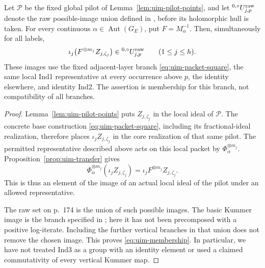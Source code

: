 \begin{theorem}
\label{thm:uim-base-membership}
Let \(\mathcal P\) be the fixed global
pilot of Lemma~\ref{lem:uim-pilot-points},
and let \({}^{0,\circ}U^{\rm raw}_{j,p}\)
denote the raw possible-image union
defined in \cite[Corollary~3.12,
p.~174]{IUT3}, before its holomorphic
hull is taken. For every continuous
\(\alpha\in\operatorname{Aut}(G_E)\),
put \(F=M_\alpha^{-1}\).
Then, simultaneously for all labels,
\begin{equation}\label{eq:uim-membership}
 \iota_j\!\left(F^{\otimes m_j}Z_{j,\zeta_j}\right)
       \in{}^{0,\circ}U^{\rm raw}_{j,p}
                     \qquad(1\le j\le h).
\end{equation}
These images use the fixed adjacent-layer
branch \eqref{eq:uim-packet-square},
the same local Ind1 representative
at every occurrence above \(p\),
the identity elsewhere, and identity
Ind2. The assertion is membership
for this branch, not compatibility
of all branches.
\end{theorem}
\begin{proof}
Lemma~\ref{lem:uim-pilot-points} puts
\(Z_{j,\zeta_j}\) in the local ideal
of \(\mathcal P\).
The concrete base construction
\eqref{eq:uim-packet-square},
including its fractional-ideal
realization, therefore places
\(\iota_j Z_{j,\zeta_j}\) in the
core realization of that same
pilot. The permitted representative
described above acts on this
local packet by
\(\Phi_\alpha^{\otimes m_j}\).
Proposition~\ref{prop:uim-transfer}
gives
\[
 \Phi_\alpha^{\otimes m_j}
       (\iota_jZ_{j,\zeta_j})
       =\iota_j F^{\otimes m_j}Z_{j,\zeta_j}.
\]
This is thus an element of the
image of an actual local ideal
of the pilot under an allowed
representative.

The raw set on p.~174 is the union
of such possible images.
The basic Kummer image is the
branch specified in
\cite[Proposition~3.5(ii)(a)(1),
pp.~104--105]{IUT3}; here it has
not been precomposed with a
positive log-iterate. Including
the further vertical branches
in that union does not remove
the chosen image.
This proves \eqref{eq:uim-membership}.
In particular, we have not
treated Ind3 as a group with
an identity element or used
a claimed commutativity of
every vertical Kummer map.
\end{proof}

